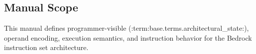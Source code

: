 \subsection{Manual Scope}
This manual defines programmer-visible (:term:base.terms.architectural_state:), operand encoding, execution semantics,
and instruction behavior for the Bedrock instruction set architecture.

\Needspace{3.5in}
